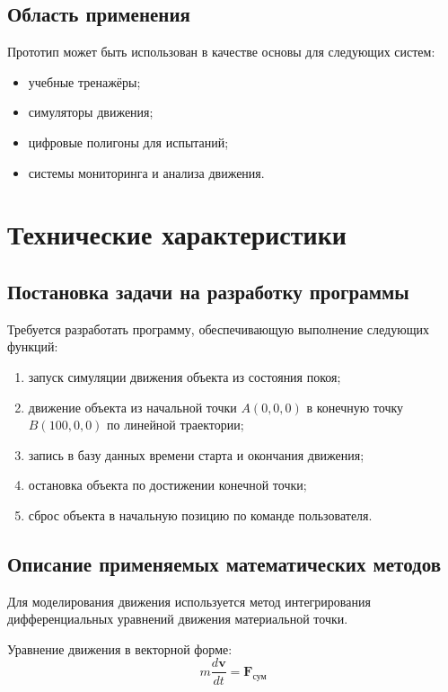 \documentclass[12pt, a4paper]{article}
\begin{document}
\subsection{Область применения}
Прототип может быть использован в качестве основы для следующих систем:
\begin{itemize}
    \item учебные тренажёры;
    \item симуляторы движения;
    \item цифровые полигоны для испытаний;
    \item системы мониторинга и анализа движения.
\end{itemize}

\section{Технические характеристики}

\subsection{Постановка задачи на разработку программы}

Требуется разработать программу, обеспечивающую выполнение следующих функций:
\begin{enumerate}
    \item запуск симуляции движения объекта из состояния покоя;
    \item движение объекта из начальной точки $A(0,0,0)$ в конечную точку $B(100,0,0)$ по линейной траектории;
    \item запись в базу данных времени старта и окончания движения;
    \item остановка объекта по достижении конечной точки;
    \item сброс объекта в начальную позицию по команде пользователя.
\end{enumerate}

\subsection{Описание применяемых математических методов}

Для моделирования движения используется метод интегрирования дифференциальных уравнений движения материальной точки.

Уравнение движения в векторной форме:
\begin{equation}
    m \frac{d\mathbf{v}}{dt} = \mathbf{F}_{\text{сум}}
\end{equation}
\end{document}
